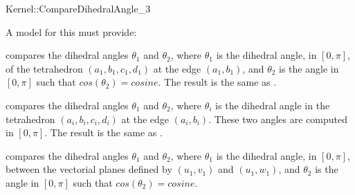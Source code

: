\begin{ccRefFunctionObjectConcept}{Kernel::CompareDihedralAngle_3}

A model for this must provide:


      {compares the dihedral angles $\theta_1$ and $\theta_2$, where
        $\theta_1$ is the dihedral angle, in $[0, \pi]$, of the tetrahedron
        $(a_1, b_1, c_1, d_1)$ at the edge $(a_1, b_1)$, and $\theta_2$ is
        the angle in $[0, \pi]$ such that $cos(\theta_2) = cosine$.
        The result is the same as .
        }

      {compares the dihedral angles $\theta_1$ and $\theta_2$, where
        $\theta_i$ is the dihedral angle in the tetrahedron $(a_i, b_i,
        c_i, d_i)$ at the edge $(a_i, b_i)$. These two angles are computed
        in $[0, \pi]$.
        The result is the same as .
        }

      {compares the dihedral angles $\theta_1$ and $\theta_2$, where
        $\theta_1$ is the dihedral angle, in $[0, \pi]$, between the
        vectorial planes defined by $(u_1, v_1)$ and $(u_1, w_1)$, and
        $\theta_2$ is the angle in $[0, \pi]$ such that $cos(\theta_2) =
        cosine$.
        }


\end{ccRefFunctionObjectConcept}

